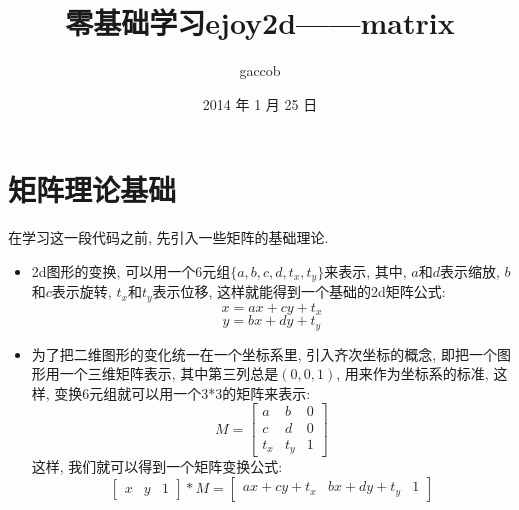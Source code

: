 

\title {\ZHH \huge 零基础学习ejoy2d——matrix}
\author {\small gaccob}
\date {\small 2014 年 1 月 25 日}
\maketitle

\vspace {10pt}
\section{\Large \ZHH 矩阵理论基础} {
    { 在学习这一段代码之前, 先引入一些矩阵的基础理论. }

    \begin {itemize}

    \item {
        2d图形的变换, 可以用一个6元组$\{a, b, c, d, t_x, t_y\}$来表示, 其中, $a$和$d$表示缩放, $b$和$c$表示旋转, $t_x$和$t_y$表示位移, 这样就能得到一个基础的2d矩阵公式:
        \begin{equation}\label{raw1}
            x = ax + cy + t_x
        \end{equation}
        \begin{equation}\label{raw2}
            y = bx + dy + t_y
        \end{equation}
    }

    \item {
        为了把二维图形的变化统一在一个坐标系里, 引入齐次坐标的概念, 即把一个图形用一个三维矩阵表示, 其中第三列总是$(0,0,1)$, 用来作为坐标系的标准, 这样, 变换6元组就可以用一个3*3的矩阵来表示:
         \begin{equation}\label{matrix}
            M =
            \begin{bmatrix}
                a & b & 0 \\
                c & d & 0 \\
                t_x & t_y & 1
            \end{bmatrix}
        \end{equation}
        这样, 我们就可以得到一个矩阵变换公式:
        \begin{equation}\label{transform}
            \begin{bmatrix}
                x & y & 1
            \end{bmatrix}
            * M =
            \begin{bmatrix}
                ax + cy + t_x & bx + dy + t_y & 1
            \end{bmatrix}
        \end{equation}
    }


\end{itemize}}
